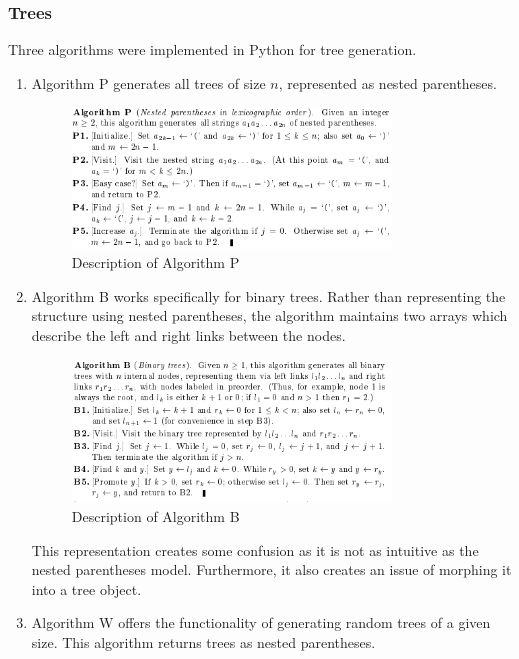 \documentclass[12pt]{article}
\begin{document}
\subsubsection{Trees}
Three algorithms were implemented in Python for tree generation. 

\begin{enumerate}
\item Algorithm P generates all trees of size \(n\), represented as nested parentheses.

\begin{figure}[h]
\centering
\includegraphics[width=0.8\textwidth]{images/tree_P.PNG}
\caption{Description of Algorithm P \cite{tree_P}}
\end{figure}

\item Algorithm B works specifically for binary trees. Rather than representing the structure using nested parentheses, the algorithm maintains two arrays which describe the left and right links between the nodes.

\begin{figure}[h]
\centering
\includegraphics[width=0.8\textwidth]{images/tree_B.PNG}
\caption{Description of Algorithm B \cite{tree_B}}
\end{figure}

This representation creates some confusion as it is not as intuitive as the nested parentheses model. Furthermore, it also creates an issue of morphing it into a tree object.

\item Algorithm W offers the functionality of generating random trees of a given size. This algorithm returns trees as nested parentheses.


\end{enumerate}
\end{document}
